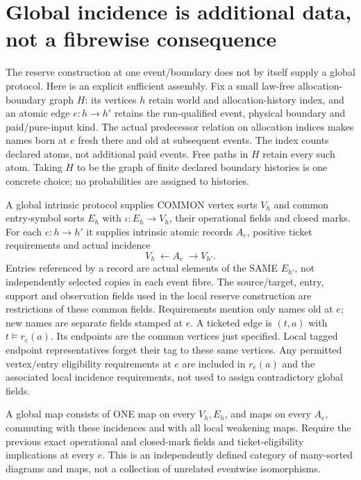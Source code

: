 \documentclass[11pt]{article}
\begin{document}
\section{Global incidence is additional data, not a fibrewise consequence}
The reserve construction at one event/boundary does not by itself supply a global protocol. Here is an explicit sufficient assembly. Fix a small law-free allocation-boundary graph $H$: its vertices $h$ retain world and allocation-history index, and an atomic edge $e:h\to h'$ retains the run-qualified event, physical boundary and paid/pure-input kind. The actual predecessor relation on allocation indices makes names born at $e$ fresh there and old at subsequent events. The index counts declared atoms, not additional paid events. Free paths in $H$ retain every such atom. Taking $H$ to be the graph of finite declared boundary histories is one concrete choice; no probabilities are assigned to histories.

A global intrinsic protocol supplies COMMON vertex sorts $V_h$ and common entry-symbol sorts $E_h$ with $\iota:E_h\to V_h$, their operational fields and closed marks. For each $e:h\to h'$ it supplies intrinsic atomic records $A_e$, positive ticket requirements and actual incidence
\[
                       V_h\ \longleftarrow A_e\ \longrightarrow V_{h'}.
\]
Entries referenced by a record are actual elements of the SAME $E_{h'}$, not independently selected copies in each event fibre. The source/target, entry, support and observation fields used in the local reserve construction are restrictions of these common fields. Requirements mention only names old at $e$; new names are separate fields stamped at $e$. A ticketed edge is $(t,a)$ with $t\models r_e(a)$. Its endpoints are the common vertices just specified. Local tagged endpoint representatives forget their tag to these same vertices. Any permitted vertex/entry eligibility requirements at $e$ are included in $r_e(a)$ and the associated local incidence requirements, not used to assign contradictory global fields.

A global map consists of ONE map on every $V_h,E_h$, and maps on every $A_e$, commuting with these incidences and with all local weakening maps. Require the previous exact operational and closed-mark fields and ticket-eligibility implications at every $e$. This is an independently defined category of many-sorted diagrams and maps, not a collection of unrelated eventwise isomorphisms.
\end{document}
